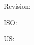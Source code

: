 \documentclass{article}
\begin{document}
Revision: \makerevision

ISO: \isodate{\gitdateornow}

US: \usdate{\gitdateornow}
\end{document}
